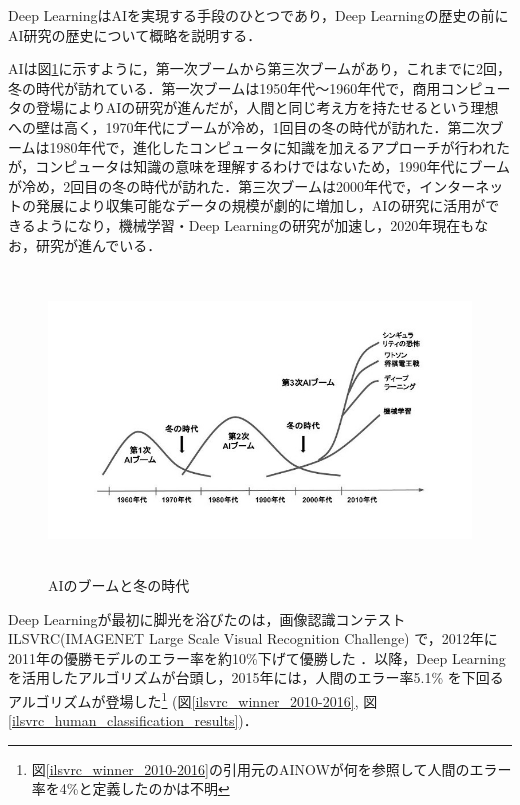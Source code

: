 Deep LearningはAIを実現する手段のひとつであり，Deep Learningの歴史の前にAI研究の歴史について概略を説明する．\cite{dl_hist1} \cite{dl_hist2} \cite{dl_hist3}

AIは図\ref{ai_hist_jpg}に示すように，第一次ブームから第三次ブームがあり，これまでに2回，冬の時代が訪れている．第一次ブームは1950年代～1960年代で，商用コンピュータの登場によりAIの研究が進んだが，人間と同じ考え方を持たせるという理想への壁は高く，1970年代にブームが冷め，1回目の冬の時代が訪れた．第二次ブームは1980年代で，進化したコンピュータに知識を加えるアプローチが行われたが，コンピュータは知識の意味を理解するわけではないため，1990年代にブームが冷め，2回目の冬の時代が訪れた．第三次ブームは2000年代で，インターネットの発展により収集可能なデータの規模が劇的に増加し，AIの研究に活用ができるようになり，機械学習・Deep Learningの研究が加速し，2020年現在もなお，研究が進んでいる．

\begin{figure} [H]
	\begin{center}
		\includegraphics[clip, height=8cm, bb=10 0 160 104]{data/figure/ai_hist.jpg}
		\caption{AIのブームと冬の時代}
		\label{ai_hist_jpg}
	\end{center}
\end{figure}

Deep Learningが最初に脚光を浴びたのは，画像認識コンテスト ILSVRC(IMAGENET Large Scale Visual Recognition Challenge) \cite{overview_ilsvrc}で，2012年に2011年の優勝モデルのエラー率を約10\%下げて優勝した \cite{dl_hist4}．以降，Deep Learningを活用したアルゴリズムが台頭し，2015年には，人間のエラー率5.1\% \cite{arxiv_ilsvrc}を下回るアルゴリズムが登場した\footnote{図\ref{ilsvrc_winner_2010-2016}の引用元のAINOWが何を参照して人間のエラー率を4\%と定義したのかは不明} (図\ref{ilsvrc_winner_2010-2016}, 図\ref{ilsvrc_human_classification_results})．

